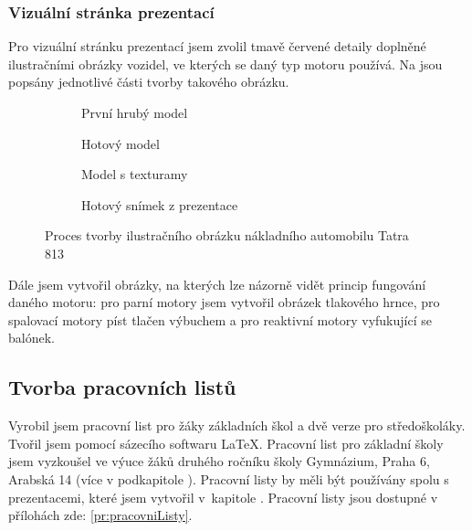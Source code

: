 \subsubsection{Vizuální stránka prezentací}
{Pro vizuální stránku prezentací jsem zvolil tmavě červené detaily doplněné ilustračními obrázky vozidel, ve kterých se daný typ motoru používá. Na  jsou popsány jednotlivé části tvorby takového obrázku.}
\begin{figure}[H]
    \begin{subfigure}{0.5\textwidth}
        \centering
        \setlength{\fboxsep}{0pt}
        \caption{První hrubý model}
    \end{subfigure}
    \begin{subfigure}{0.5\linewidth}
        \centering
        \setlength{\fboxsep}{0pt}
        \caption{Hotový model}
    \end{subfigure}
    \begin{subfigure}{0.5\linewidth}
        \centering
        \setlength{\fboxsep}{0pt}
        \caption{Model s texturamy}
    \end{subfigure}
    \begin{subfigure}{0.5\linewidth}
        \centering
        \setlength{\fboxsep}{0pt}
        \caption{Hotový snímek z prezentace}
    \end{subfigure}
    \caption{Proces tvorby ilustračního obrázku nákladního automobilu Tatra 813 \jaObr}
    \label{obr:tatra813}
\end{figure}
{Dále jsem vytvořil obrázky, na kterých lze názorně vidět princip fungování daného motoru: pro parní motory jsem vytvořil obrázek tlakového hrnce, pro spalovací motory píst tlačen výbuchem a pro reaktivní motory vyfukující se balónek.}
\newpage
\subsection{Tvorba pracovních listů}
{Vyrobil jsem pracovní list pro žáky základních škol a dvě verze pro středoškoláky. Tvořil jsem pomocí sázecího softwaru \LaTeX. Pracovní list pro základní školy jsem vyzkoušel ve výuce žáků druhého ročníku školy Gymnázium, Praha 6, Arabská 14 (více v podkapitole ). Pracovní listy by měli být používány spolu s prezentacemi, které jsem vytvořil v~kapitole .}\odst
{Pracovní listy jsou dostupné v přílohách zde: \ref{pr:pracovniListy}.}
